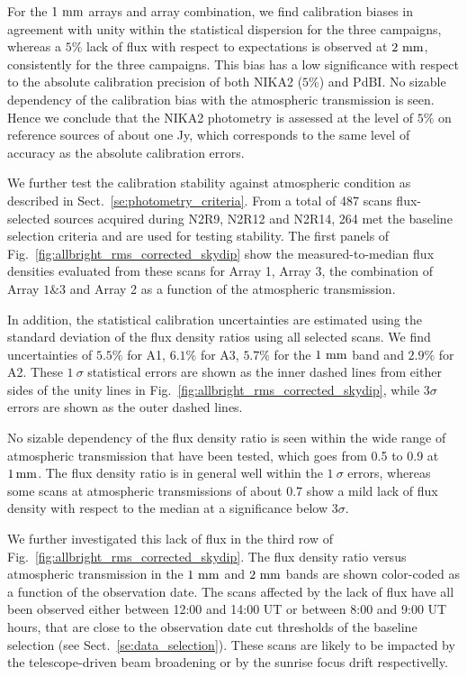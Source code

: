 For the $1~\rm{mm}$ arrays and array combination, we find calibration
biases in agreement with unity within the statistical dispersion for
the three campaigns, whereas a $5\%$ lack of flux with respect to
expectations is observed at $2~\rm{mm}$, consistently for the three
campaigns. This bias has a low significance with respect to the
absolute calibration precision of both NIKA2 ($5\%$) and PdBI.
No sizable dependency of the calibration bias with the
atmospheric transmission is seen. Hence we conclude that the NIKA2
photometry is assessed at the level of $5\%$ on reference sources of
about one Jy, which corresponds to the same level of accuracy as the
absolute calibration errors.   

We further test the calibration
stability against atmospheric condition as described in
Sect.~\ref{se:photometry_criteria}. From a total of 487 scans
flux-selected sources acquired during N2R9, N2R12 and N2R14, 264 met
the baseline selection criteria and are used for testing stability.
The first panels of Fig.~\ref{fig:allbright_rms_corrected_skydip} show the
measured-to-median flux densities evaluated from these scans for Array
1, Array 3, the combination of Array $1\&3$ and Array 2 as a function of the
atmospheric transmission.

In addition, the statistical calibration uncertainties are
estimated using the standard deviation of the flux density ratios
using all selected scans. We find uncertainties of $5.5\%$ for A1,
$6.1\%$ for A3, $5.7\%$ for the $1~\rm{mm}$ band and $2.9\%$ for A2.
These $1~\sigma$ statistical
errors are shown as the inner dashed lines from either sides of the
unity lines in Fig.~\ref{fig:allbright_rms_corrected_skydip}, while
$3\sigma$ errors are shown as the outer dashed lines.

No sizable dependency of the flux density ratio is seen within the
wide range of atmospheric transmission that have been tested, which goes
from 0.5 to 0.9 at $1\,\rm{mm}$. 
The flux density ratio is in general well within the $1~\sigma$ errors, whereas
some scans at atmospheric transmissions of about 0.7  show a mild lack
of flux density with respect to the median at a significance below
$3\sigma$.

We further investigated this lack of flux in the third row of
Fig.~\ref{fig:allbright_rms_corrected_skydip}. The flux density ratio
versus atmospheric transmission in the $1~\rm{mm}$ and $2~\rm{mm}$
bands are shown color-coded as a function of the observation date. The
scans affected by the lack of flux have all been observed 
either between 12:00 and 14:00 UT or between 8:00 and 9:00 UT hours,
that are close to the observation date cut thresholds of the baseline
selection (see Sect.~\ref{se:data_selection}). These scans are likely
to be impacted by the telescope-driven beam broadening or by the
sunrise focus drift respectivelly.

